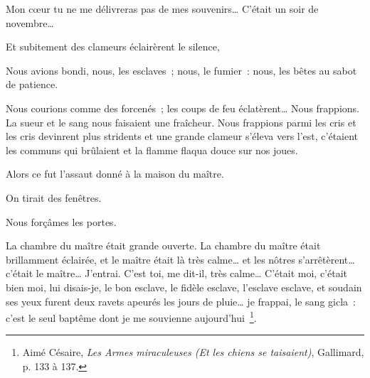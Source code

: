 \documentclass[french,twoside]{book} %
\newenvironment{quoteblock}%
  {\begin{quoting}}
  {\end{quoting}}
\newenvironment{quotebar}{%
    \def\FrameCommand{{\color{rubric!10!}\vrule width 0.5em} \hspace{0.9em}}%
    \def\OuterFrameSep{\itemsep} %
    \MakeFramed {\advance\hsize-\width \FrameRestore}
  }%
  {%
    \endMakeFramed
  }
\renewenvironment{quoteblock}%
  {%
    \savenotes
    \setstretch{0.9}
    \normalfont
    \begin{quotebar}
  }
  {%
    \end{quotebar}
    \spewnotes
  }
\begin{document}
\begin{quoteblock}
 \noindent Mon cœur tu ne me délivreras pas de mes souvenirs… C’était un soir de novembre…\par
 Et subitement des clameurs éclairèrent le silence,\par
 Nous avions bondi, nous, les esclaves ; nous, le fumier : nous, les bêtes au sabot de patience.\par
 Nous courions comme des forcenés ; les coups de feu éclatèrent… Nous frappions. La sueur et le sang nous faisaient une fraîcheur. Nous frappions parmi les cris et les cris devinrent plus stridents et une grande clameur s’éleva vers l’est, c’étaient les communs qui brûlaient et la flamme flaqua douce sur nos joues.\par
 Alors ce fut l’assaut donné à la maison du maître.\par
 On tirait des fenêtres.\par
 Nous forçâmes les portes.\par
 La chambre du maître était grande ouverte. La chambre du maître était brillamment éclairée, et le maître était là très calme… et les nôtres s’arrêtèrent… c’était le maître… J’entrai. C’est toi, me dit-il, très calme… C’était moi, c’était bien moi, lui disais-je, le bon esclave, le fidèle esclave, l’esclave esclave, et soudain ses yeux furent deux ravets apeurés les jours de pluie… je frappai, le sang gicla : c’est le seul baptême dont je me souvienne aujourd’hui \footnote{Aimé Césaire, \emph{Les Armes miraculeuses (Et les chiens se taisaient)}, Gallimard, p. 133 à 137.}.
 \end{quoteblock}
\end{document}
